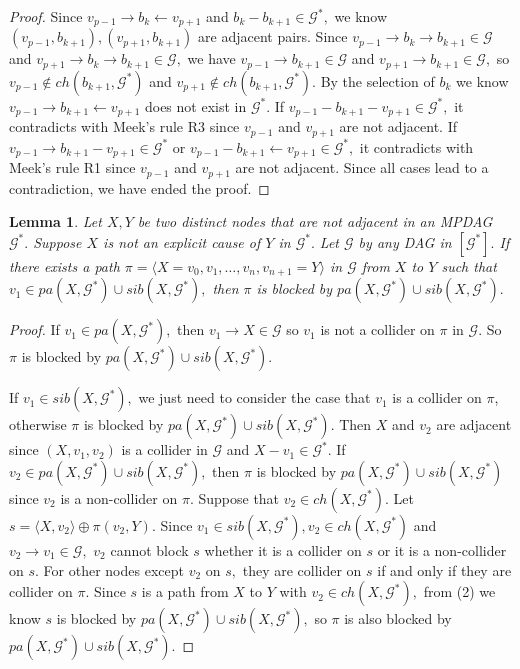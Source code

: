 \documentclass{article}
\newtheorem{lemma}{Lemma}
\begin{document}
\begin{proof}
Since $v_{p-1}\to b_k\leftarrow v_{p+1}$ and $b_k-b_{k+1}\in \mathcal{G}^*,$ we know $(v_{p-1},b_{k+1}),(v_{p+1},b_{k+1})$ are adjacent pairs. Since $v_{p-1}\to b_k\to b_{k+1}\in \mathcal{G}$ and $v_{p+1}\to b_k\to b_{k+1}\in \mathcal{G},$ we have $v_{p-1}\to b_{k+1}\in \mathcal{G}$ and $v_{p+1}\to b_{k+1}\in \mathcal{G},$ so $v_{p-1}\not\in ch(b_{k+1},\mathcal{G}^*)$ and $v_{p+1}\not\in ch(b_{k+1},\mathcal{G}^*).$ By the selection of $b_k$ we know $v_{p-1}\to b_{k+1}\leftarrow v_{p+1}$ does not exist in $\mathcal{G}^*.$ If $v_{p-1}-b_{k+1}-v_{p+1}\in \mathcal{G}^*,$ it contradicts with Meek's rule R3 since $v_{p-1}$ and $v_{p+1}$ are not adjacent. If $v_{p-1}\to b_{k+1}-v_{p+1}\in \mathcal{G}^*$ or $v_{p-1}-b_{k+1}\leftarrow v_{p+1}\in \mathcal{G}^*,$ it contradicts with Meek's rule R1 since $v_{p-1}$ and $v_{p+1}$ are not adjacent. Since all cases lead to a contradiction, we have ended the proof.
\end{proof}

\begin{lemma}
\label{lemma:explicit only if pa or sib}
Let $X,Y$ be two distinct nodes that are not adjacent in an MPDAG $\mathcal{G}^*.$ Suppose $X$ is not an explicit cause of $Y$ in $\mathcal{G}^*.$ Let $\mathcal{G}$ by any DAG in $[\mathcal{G}^*].$ If there exists a path $\pi=\langle X=v_0,v_1,\dots,v_n,v_{n+1}=Y\rangle$ in $\mathcal{G}$ from $X$ to $Y$ such that $v_1\in pa(X,\mathcal{G}^*)\cup sib(X,\mathcal{G}^*),$ then $\pi$ is blocked by $pa(X,\mathcal{G}^*)\cup sib(X,\mathcal{G}^*).$ 
\end{lemma}
\begin{proof}
If $v_1\in pa(X,\mathcal{G}^*),$ then $v_1\to X\in \mathcal{G}$ so $v_1$ is not a collider on $\pi$ in $\mathcal{G}.$ So $\pi$ is blocked by $pa(X,\mathcal{G}^*)\cup sib(X,\mathcal{G}^*).$

If $v_1\in sib(X,\mathcal{G}^*),$ we just need to consider the case that $v_1$ is a collider on $\pi$, otherwise $\pi$ is blocked by $pa(X,\mathcal{G}^*)\cup sib(X,\mathcal{G}^*).$  Then $X$ and $v_2$ are adjacent since $(X,v_1,v_2)$ is a collider in $\mathcal{G}$ and $X-v_1\in \mathcal{G}^*.$ If $v_2\in pa(X,\mathcal{G}^*)\cup sib(X,\mathcal{G}^*),$ then $\pi$ is blocked by $pa(X,\mathcal{G}^*)\cup sib(X,\mathcal{G}^*)$ since $v_2$ is a non-collider on $\pi.$ Suppose that $v_2\in ch(X,\mathcal{G}^*).$ Let $s=\langle X,v_2\rangle \oplus \pi(v_2,Y).$ Since $v_1\in sib(X,\mathcal{G}^*), v_2\in ch(X,\mathcal{G}^*)$ and $v_2\to v_1\in \mathcal{G},$ $v_2$ cannot block $s$ whether it is a collider on $s$ or it is a non-collider on $s.$ For other nodes except $v_2$ on $s,$ they are collider on $s$ if and only if they are collider on $\pi.$ Since $s$ is a path from $X$ to $Y$ with $v_2\in ch(X,\mathcal{G}^*),$ from (2) we know $s$ is blocked by $pa(X,\mathcal{G}^*)\cup sib(X,\mathcal{G}^*),$ so $\pi$ is also blocked by $pa(X,\mathcal{G}^*)\cup sib(X,\mathcal{G}^*).$
\end{proof}
\end{document}
